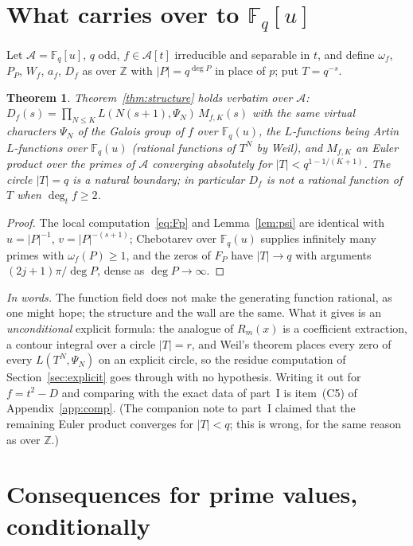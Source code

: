 \documentclass[11pt,a4paper]{article}
\newtheorem{theorem}{Theorem}
\theoremstyle{remark}\newtheorem{remark}[theorem]{Remark}
\newcommand{\Z}{\mathbb{Z}}\newcommand{\Q}{\mathbb{Q}}\newcommand{\F}{\mathbb{F}}\newcommand{\C}{\mathbb{C}}
\begin{document}
\section{What carries over to $\F_q[u]$}\label{sec:ff}

Let $\mathcal A=\F_q[u]$, $q$ odd, $f\in\mathcal A[t]$ irreducible and separable in $t$, and define $\omega_f$,
$P_P$, $W_f$, $a_f$, $D_f$ as over $\Z$ with $|P|=q^{\deg P}$ in place of $p$; put $T=q^{-s}$.

\begin{theorem}\label{thm:ffstructure}
Theorem~\ref{thm:structure} holds verbatim over $\mathcal A$: $D_f(s)=\prod_{N\le K}L(N(s+1),\Psi_N)\,M_{f,K}(s)$
with the same virtual characters $\Psi_N$ of the Galois group of $f$ over $\F_q(u)$, the $L$-functions being
Artin $L$-functions over $\F_q(u)$ (rational functions of $T^N$ by Weil), and $M_{f,K}$ an Euler product over
the primes of $\mathcal A$ converging absolutely for $|T|<q^{1-1/(K+1)}$. The circle $|T|=q$ is a natural
boundary; in particular $D_f$ is not a rational function of $T$ when $\deg_tf\ge2$.
\end{theorem}
\begin{proof}
The local computation~\eqref{eq:Fp} and Lemma~\ref{lem:psi} are identical with $u=|P|^{-1}$, $v=|P|^{-(s+1)}$;
Chebotarev over $\F_q(u)$ supplies infinitely many primes with $\omega_f(P)\ge1$, and the zeros of $F_P$ have
$|T|\to q$ with arguments $(2j+1)\pi/\deg P$, dense as $\deg P\to\infty$.
\end{proof}

\emph{In words.} The function field does not make the generating function rational, as one might hope; the
structure and the wall are the same. What it gives is an \emph{unconditional} explicit formula: the analogue
of $R_m(x)$ is a coefficient extraction, a contour integral over a circle $|T|=r$, and Weil's theorem places
every zero of every $L(T^N,\Psi_N)$ on an explicit circle, so the residue computation of
Section~\ref{sec:explicit} goes through with no hypothesis. Writing it out for $f=t^2-D$ and comparing with
the exact data of part~I is item~(C5) of Appendix~\ref{app:comp}. (The companion note to part~I claimed that
the remaining Euler product converges for $|T|<q$; this is wrong, for the same reason as over $\Z$.)

\section{Consequences for prime values, conditionally}\label{sec:primes}
\end{document}
